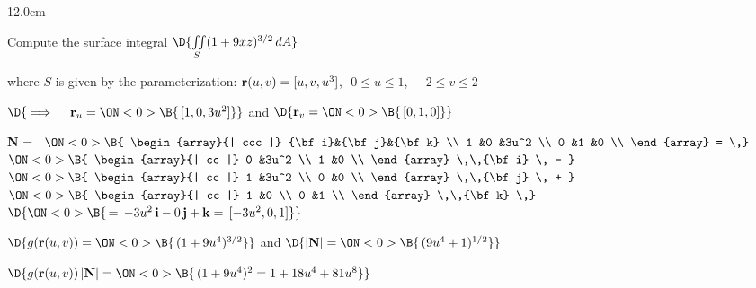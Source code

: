 \begin{frame}
\begin{columns}\begin{column}{12.0cm}
\scriptsize

\EX Compute the surface integral \qquad $\D{\iint \limits_{S} (1 + 9xz)^{3/2}\, dA}$

\vspace{0.1cm}

where $S$ is given by the parameterization: ${\bf r}(u,v) = [u,v,u^3]$,\,\, $0 \le u \le 1$,\,\, $-2 \le v \le 2$

\vspace{0.2cm}

$\D{
\implies \quad {\bf r}_u =
\ON<0>{\B{\, [1,0,3u^2]}}}$ \qquad 
and
\qquad $\D{
{\bf r}_v = 
\ON<0>{\B{\,[0,1,0]}}}$

\vspace{0.3cm}

{\bf N} = \,
$\ON<0>{\B{
\begin{array}{| ccc |}
	{\bf i}&{\bf j}&{\bf k} \\
	1 &0 &3u^2 \\
 	0 &1 &0 \\
\end{array}
= \,}}$
$\ON<0>{\B{
\begin{array}{| cc |}
	0 &3u^2 \\
 	1 &0 \\
\end{array}
 \,\,{\bf i} \, - }}$\,\,
$\ON<0>{\B{
\begin{array}{| cc |}
	1 &3u^2 \\
 	0 &0 \\
\end{array}
 \,\,{\bf j} \, + }}$\,\,
$\ON<0>{\B{
\begin{array}{| cc |}
	1 &0 \\
 	0 &1 \\
\end{array}
\,\,{\bf k} \,}}$
$\D{
\ON<0>{\B{\, = \, -3u^2 \,{\bf i} - 0\,{\bf j} + {\bf k} = \, [-3u^2,0,1]}}}$

\vspace{0.4cm}

$\D{g({\bf r}(u,v)) = 
\ON<0>{\B{\,(1+9u^4)^{3/2}}}}$
\quad and \quad 
$\D{|{\bf N}| = 
\ON<0>{\B{\,(9u^4+1)^{1/2}}}}$

\vspace{0.3cm}

$\D{g({\bf r}(u,v))\, |{\bf N}| = 
\ON<0>{\B{\,(1+9u^4)^2 = 1 + 18u^4 + 81u^8}}}$


\end{column}
\end{columns}
\end{frame}

